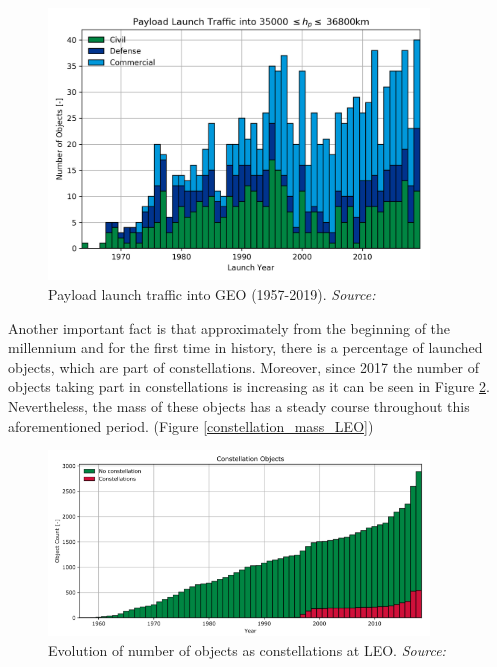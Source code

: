 \begin{figure}
\centering
\includegraphics[width=0.9\textwidth]{Images/launch_traffic_GEO.png}\caption{Payload launch traffic into GEO (1957-2019). \textit{Source: \cite{ESA 2019}}}
\label{launch_traffic_GEO} 
\end{figure}

Another important fact is that approximately from the beginning of the millennium and for the first time in history, there is a percentage of launched objects, which are part of constellations. Moreover, since 2017 the number of objects taking part in constellations is increasing as it can be seen in Figure \ref{constellation_count_LEO}. Nevertheless, the mass of these objects has a steady course throughout this aforementioned period. (Figure \ref{constellation_mass_LEO})

\begin{figure}
\centering
\includegraphics[width=0.9\textwidth]{Images/constellation_count_LEO.png}\caption{Evolution of number of objects as constellations at LEO. \textit{Source: \cite{ESA 2019}}}
\label{constellation_count_LEO} 
\end{figure}


